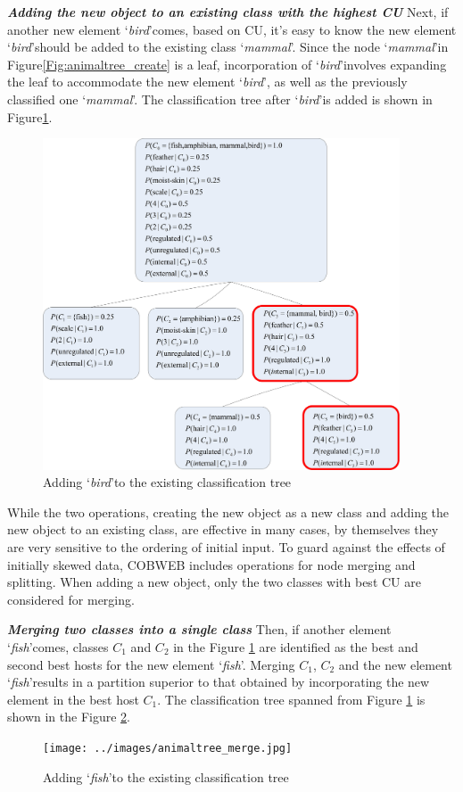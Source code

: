 \textbf{\emph{Adding the new object to an existing class with the highest CU}} Next, if another new element \lq{\emph{bird}}\rq comes, based on CU, it's easy to know the new element \lq{\emph{bird}}\rq should be added to the existing class \lq{\emph{mammal}}\rq. Since the node \lq{\emph{mammal}}\rq in Figure\ref{Fig:animaltree_create} is a leaf, incorporation of \lq{\emph{bird}}\rq involves expanding the leaf to accommodate the new element \lq{\emph{bird}}\rq, as well as the previously classified one \lq{\emph{mammal}}\rq. The classification tree after \lq{\emph{bird}}\rq is added is shown in Figure\ref{Fig:animaltree_add}.
\begin{figure}[!ht]
    \centering
    \includegraphics[width=300pt]{../images/animaltree_add.jpg}
    \caption{Adding \lq{\emph{bird}}\rq to the existing classification tree}
    \label{Fig:animaltree_add}
\end{figure}

While the two operations, creating the new object as a new class and adding the new object to an existing class, are effective in many cases, by themselves they are very sensitive to the ordering of initial input. To guard against the effects of initially skewed data, COBWEB includes operations for node merging and splitting. When adding a new object, only the two classes with best CU are considered for merging\cite{fisher1987knowledge}. 

\textbf{\emph{Merging two classes into a single class}} Then, if another element \lq{\emph{fish}}\rq comes, classes $C_1$ and $C_2$ in the Figure \ref{Fig:animaltree_add} are identified as the best and second best hosts for the new element \lq{\emph{fish}}\rq. Merging $C_1$, $C_2$ and the new element \lq{\emph{fish}}\rq results in a partition superior to that obtained by incorporating the new element in the best host $C_1$. The classification tree spanned from Figure \ref{Fig:animaltree_add} is shown in the Figure \ref{Fig:animaltree_merge}.
\begin{figure}[!ht]
    \centering
    \texttt{[image: ../images/animaltree\_merge.jpg]}
    \caption{Adding \lq{\emph{fish}}\rq to the existing classification tree}
    \label{Fig:animaltree_merge}
\end{figure}

